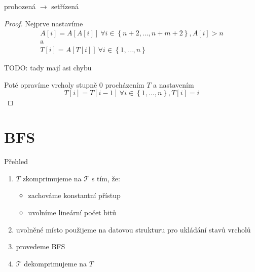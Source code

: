 \documentclass{beamer}
\begin{document}
	\begin{frame}{prohozená $\rightarrow$ setřízená}
		\begin{proof}
			Nejprve nastavíme 
			\begin{gather*}
				A[i] = A[A[i]]\ \forall i \in \left\{n + 2, \ldots, n + m + 2\right\}, A[i] > n \\
				\text{a} \\
				T[i] = A[T[i]]\ \forall i \in \left\{1, \ldots, n\right\}
			\end{gather*}

			TODO: tady mají asi chybu

			Poté opravíme vrcholy stupně $0$ procházením $T$ a nastavením
			$$T[i] = T[i - 1]\ \forall i \in \left\{1, \ldots, n\right\}, T[i] = i$$

		\end{proof}
	\end{frame}

	\section{BFS}
	\begin{frame}{Přehled}
		\begin{enumerate}
			\item $T$ zkomprimujeme na $\mathcal{T}$ s tím, že:
			\begin{itemize}
				\item zachováme konstantní přístup
				\item uvolníme lineární počet bitů
			\end{itemize}
			\item uvolněné místo použijeme na datovou strukturu pro ukládání stavů vrcholů
			\item provedeme BFS
			\item $\mathcal{T}$ dekomprimujeme na $T$
		\end{enumerate}
	\end{frame}
\end{document}

